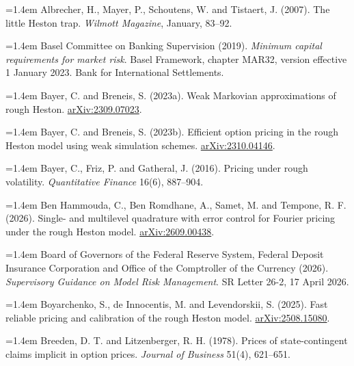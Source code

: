 \documentclass[11pt,a4paper]{article}
\begin{document}
\hangindent=1.4em Albrecher, H., Mayer, P., Schoutens, W. and Tistaert, J. (2007). The little Heston trap. \emph{Wilmott Magazine}, January, 83–92.\par

\hangindent=1.4em Basel Committee on Banking Supervision (2019). \emph{Minimum capital requirements for market risk}. Basel Framework, chapter MAR32, version effective 1 January 2023. Bank for International Settlements.\par

\hangindent=1.4em Bayer, C. and Breneis, S. (2023a). Weak Markovian approximations of rough Heston. \href{https://arxiv.org/abs/2309.07023v1}{arXiv:2309.07023}.\par

\hangindent=1.4em Bayer, C. and Breneis, S. (2023b). Efficient option pricing in the rough Heston model using weak simulation schemes. \href{https://arxiv.org/abs/2310.04146v1}{arXiv:2310.04146}.\par

\hangindent=1.4em Bayer, C., Friz, P. and Gatheral, J. (2016). Pricing under rough volatility. \emph{Quantitative Finance} 16(6), 887–904.\par

\hangindent=1.4em Ben Hammouda, C., Ben Romdhane, A., Samet, M. and Tempone, R. F. (2026). Single- and multilevel quadrature with error control for Fourier pricing under the rough Heston model. \href{https://arxiv.org/abs/2609.00438v1}{arXiv:2609.00438}.\par

\hangindent=1.4em Board of Governors of the Federal Reserve System, Federal Deposit Insurance Corporation and Office of the Comptroller of the Currency (2026). \emph{Supervisory Guidance on Model Risk Management}. SR Letter 26-2, 17 April 2026.\par

\hangindent=1.4em Boyarchenko, S., de Innocentis, M. and Levendorskii, S. (2025). Fast reliable pricing and calibration of the rough Heston model. \href{https://arxiv.org/abs/2508.15080v1}{arXiv:2508.15080}.\par

\hangindent=1.4em Breeden, D. T. and Litzenberger, R. H. (1978). Prices of state-contingent claims implicit in option prices. \emph{Journal of Business} 51(4), 621–651.\par
\end{document}
